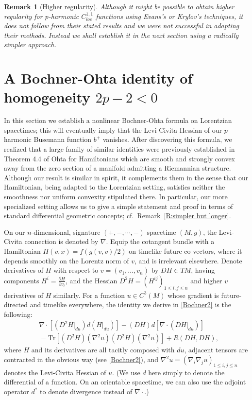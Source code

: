 \documentclass[12pt]{amsart}
\newcommand{\p}{{\partial}}
\newcommand{\pt}{{\p}}
\newcommand{\Ric}{{R}}
\renewcommand{\d}{{d}}
\newtheorem{remark}[theorem]{Remark}
\begin{document}
\fi

\begin{remark}[Higher regularity]
Although it might be possible to obtain higher regularity for $p$-harmonic $C^{1,1}_{loc}$ functions using 
Evans's \cite{Evans82} or Krylov's \cite{Krylov82} techniques, 
it does not follow from their stated results and we were not successful in adapting their methods.  Instead we shall establish it in the next section using a radically simpler approach.
\end{remark}

\section{A Bochner-Ohta identity of homogeneity $2p-2<0$}

In this section we establish a nonlinear
Bochner-Ohta formula on Lorentzian spacetimes;
this will eventually imply that the Levi-Civita Hessian of our $p$-harmonic Busemann function $b^+$ vanishes.
After discovering this formula,  we realized that 
a large family of similar identities were
previously established in Theorem 4.4 of Ohta \cite{Ohta14h}
for Hamiltonians which are smooth and strongly convex away from the zero section of a manifold admitting a Riemannian structure.
Although our result is similar in spirit, 
it complements them in the sense that our Hamiltonian, being adapted to the Lorentzian setting,
satisfies neither the smoothness nor uniform convexity stipulated there.
In particular, our more specialized setting allows us to give a simple statement and proof in terms of standard differential geometric concepts; cf.~Remark~\ref{R:simpler but longer}.

On our $n$-dimensional, signature $(+, -, \cdots, -)$ spacetime $(M,g)$,  the Levi-Civita connection is denoted by $\nabla$. 
Equip the cotangent bundle with a Hamiltonian $H(v,x) = f(g(v,v)/2)$
on timelike 
future co-vectors, where it depends smoothly on the Lorentz norm of $v$, and is irrelevant elsewhere.  
Denote derivatives of $H$ with respect to $v=(v_1,\ldots,v_n)$ by $DH \in TM$, having components $H^i = \frac{\pt H}{\pt v_i}$,
and the Hessian $D^2H=(H^{ij})_{1\le i,j \le n}$ and higher $v$ derivatives of $H$ similarly.
For a function $u \in C^3(M)$
whose gradient is future-directed and timelike everywhere,  
the identity we derive in  \eqref{Bochner2} is the following:
\begin{align}
&\nabla \cdot [(D^2 H|_{\d u}) \d (H|_{\d u})] -  %
(DH) \d [ \nabla \cdot (DH|_{\d u})]
\nonumber \\ \label{Bochner} 
&= \mathrm{Tr}[(D^2H)(\nabla^{2}u)(D^2H) (\nabla^2 u)] + \Ric(DH,DH), 
\end{align}
where $H$ and its derivatives are all tacitly composed with $\d u$,
adjacent tensors are contracted in the obvious way (see \eqref{Bochner2}), and $\nabla^2 u=(\nabla_i\nabla_j u)_{1\le i,j\le n}$ denotes the Levi-Civita Hessian of $u$. 
(We use $\d$ here simply to denote the differential of a function. On an orientable spacetime, we can also use the adjoint operator $\d^*$ to denote divergence instead of $\nabla \cdot$.)
\end{document}
